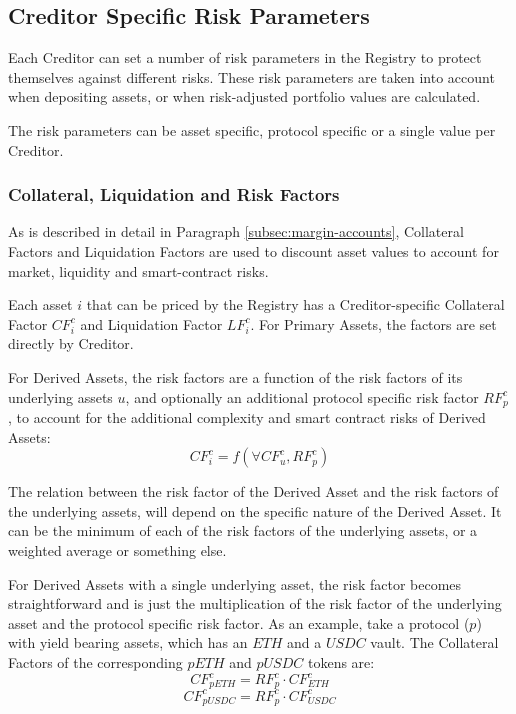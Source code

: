 \documentclass[sigconf,nonacm]{acmart}
\begin{document}
\subsection{Creditor Specific Risk Parameters}
\label{subsec:creditor-specific-cisk-parameters}
Each Creditor can set a number of risk parameters in the Registry to protect themselves against different risks.
These risk parameters are taken into account when depositing assets, or when risk-adjusted portfolio values are calculated.

The risk parameters can be asset specific, protocol specific or a single value per Creditor.

\subsubsection{Collateral, Liquidation and Risk Factors}
As is described in detail in Paragraph \ref{subsec:margin-accounts}, Collateral Factors and Liquidation Factors are used to discount asset values to account for market, liquidity and smart-contract risks.

Each asset $i$ that can be priced by the Registry has a Creditor-specific Collateral Factor $CF_{i}^{c}$ and Liquidation Factor $LF_{i}^{c}$.
For Primary Assets, the factors are set directly by Creditor.

For Derived Assets, the risk factors are a function of the risk factors of its underlying assets $u$, and optionally an additional protocol specific risk factor $RF_{p}^{c}$,
to account for the additional complexity and smart contract risks of Derived Assets:
\begin{equation}
    CF_{i}^{c} = f(\forall CF_{u}^{c}, RF_{p}^{c})
\end{equation}

The relation between the risk factor of the Derived Asset and the risk factors of the underlying assets,
will depend on the specific nature of the Derived Asset.
It can be the minimum of each of the risk factors of the underlying assets, or a weighted average or something else.

For Derived Assets with a single underlying asset,
the risk factor becomes straightforward and is just the multiplication of the risk factor of the underlying asset and the protocol specific risk factor.
As an example, take a protocol ($p$) with yield bearing assets, which has an $ETH$ and a $USDC$ vault.
The Collateral Factors of the corresponding $pETH$ and $pUSDC$ tokens are:
\begin{equation}
    CF_{pETH}^{c} = RF_{p}^{c} \cdot CF_{ETH}^{c}
\end{equation}
\begin{equation}
    CF_{pUSDC}^{c} = RF_{p}^{c} \cdot CF_{USDC}^{c}
\end{equation}
\end{document}
